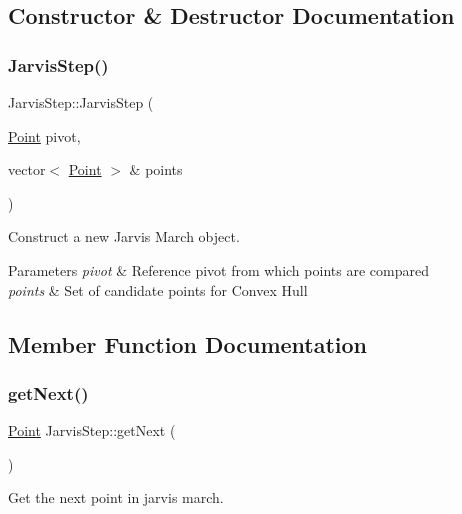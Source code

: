 \subsection{Constructor \& Destructor Documentation}
\mbox{\label{classJarvisStep_afe702ba01d8077f819b82fa698d3a835}} 
\subsubsection{\texorpdfstring{Jarvis\+Step()}{JarvisStep()}}
{\footnotesize\ttfamily Jarvis\+Step\+::\+Jarvis\+Step (\begin{DoxyParamCaption}\item[{\mbox{\hyperlink{classPoint}{Point}}}]{pivot,  }\item[{vector$<$ \mbox{\hyperlink{classPoint}{Point}} $>$ \&}]{points }\end{DoxyParamCaption})}



Construct a new Jarvis March object. 


\begin{DoxyParams}{Parameters}
{\em pivot} & Reference pivot from which points are compared \\
\hline
{\em points} & Set of candidate points for Convex Hull \\
\hline
\end{DoxyParams}


\subsection{Member Function Documentation}
\mbox{\label{classJarvisStep_abe7e3817650fed66b7c5109839d355bc}} 
\subsubsection{\texorpdfstring{get\+Next()}{getNext()}}
{\footnotesize\ttfamily \mbox{\hyperlink{classPoint}{Point}} Jarvis\+Step\+::get\+Next (\begin{DoxyParamCaption}{ }\end{DoxyParamCaption})}



Get the next point in jarvis march. 

